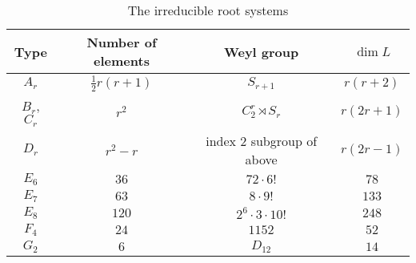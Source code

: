 \begin{table}
	\centering
	\begin{tabular}{@{}cccc@{}}\toprule
		Type & Number of elements & Weyl group & $\dim L$\\\midrule
		$A_r$ & $\frac{1}{2}r(r+1)$ & $S_{r+1}$ & $r(r+2)$\\
		$B_r$, $C_r$ & $r^2$ & $C_2^r\rtimes S_r$ & $r(2r+1)$\\
		$D_r$ & $r^2-r$ & index $2$ subgroup of above & $r(2r-1)$\\
		$E_6$ & $36$ & $72\cdot 6!$ & $78$ \\
		$E_7$ & $63$ & $8\cdot 9!$ & $133$ \\
		$E_8$ & $120$ & $2^6\cdot 3\cdot 10!$ & $248$ \\
		$F_4$ & $24$ & $1152$ & $52$ \\
		$G_2$ & $6$ & $D_12$ & $14$\\\bottomrule
	\end{tabular}
	\caption{The irreducible root systems}
\end{table}
